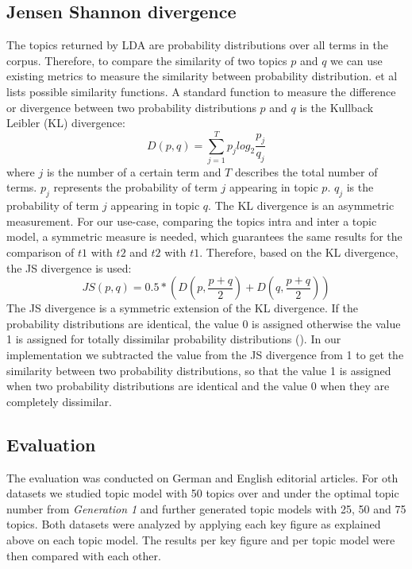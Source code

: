 \subsection{Jensen Shannon divergence}
The topics returned by \ac{LDA} are probability distributions over all terms in the corpus. Therefore, to compare the similarity of two topics $p$ and $q$ we can use existing metrics to measure the similarity between probability distribution. \cite{Lin1991} et al lists possible similarity functions. A standard function to measure the difference or divergence between two probability distributions $p$ and $q$ is the Kullback Leibler (\ac{KL}) divergence:
\begin{equation}
	D(p,q) = \sum_{j=1}^{T} p_{j} log_{2} \frac{p_{j}}{q_{j}}
\end{equation}
 where $j$ is the number of a certain term and $T$ describes the total number of terms. $p_{j}$ represents the probability of term $j$ appearing in topic $p$. $q_{j}$ is the probability of term $j$ appearing in topic $q$. The \ac{KL} divergence is an asymmetric measurement. For our use-case, comparing the topics intra and inter a topic model, a symmetric measure is needed, which guarantees the same results for the comparison of $t1$ with $t2$ and $t2$ with $t1$. Therefore, based on the \ac{KL} divergence, the \ac{JS} divergence is used:
\begin{equation}
	JS(p,q)  = 0.5 * (D(p,\frac{p + q}{2}) + D(q, \frac{p + q}{2}) )
\end{equation}
The \ac{JS} divergence  is a symmetric extension of the \ac{KL} divergence. If the probability distributions are identical, the value 0 is assigned otherwise the value 1 is assigned for totally dissimilar probability distributions (\cite{Steyvers2007}).
In our implementation we subtracted the value from the \ac{JS} divergence from 1 to get the similarity between two probability distributions, so that the value 1 is assigned when two probability distributions are identical and the value 0 when they are completely dissimilar. 

\subsection{Evaluation}
The evaluation was conducted on German and English editorial articles. For oth datasets we studied topic model with 50 topics over and under the optimal topic number from \textit{Generation 1} and further generated topic models with 25, 50 and  75 topics. Both datasets were analyzed by applying each key figure as explained above on each topic model. The results per key figure and per topic model were then compared with each other.
